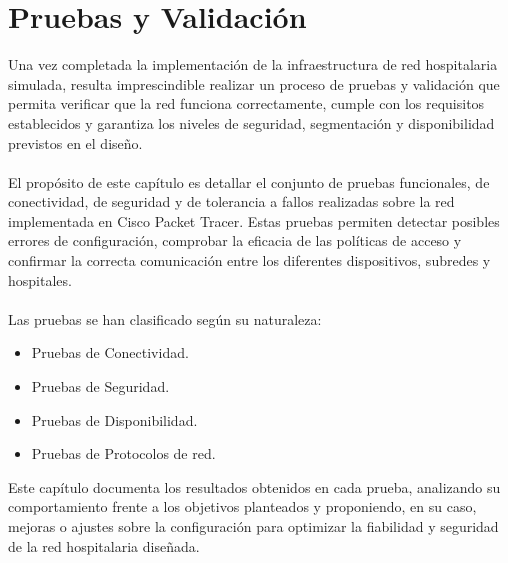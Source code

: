 
\chapter{Pruebas y Validación}\label{pruebas}
Una vez completada la implementación de la infraestructura de red hospitalaria simulada, resulta imprescindible realizar un proceso de pruebas y validación que permita 
verificar que la red funciona correctamente, cumple con los requisitos establecidos y garantiza los niveles de seguridad, segmentación y disponibilidad previstos en el diseño.
\\ \\
El propósito de este capítulo es detallar el conjunto de pruebas funcionales, de conectividad, de seguridad y de tolerancia a fallos realizadas sobre la red implementada en 
Cisco Packet Tracer. Estas pruebas permiten detectar posibles errores de configuración, comprobar la eficacia de las políticas de acceso y confirmar la correcta comunicación 
entre los diferentes dispositivos, subredes y hospitales.
\\ \\
Las pruebas se han clasificado según su naturaleza:
\begin{itemize}
    \item Pruebas de Conectividad.
    \item Pruebas de Seguridad.
    \item Pruebas de Disponibilidad.
    \item Pruebas de Protocolos de red.
\end{itemize}

Este capítulo documenta los resultados obtenidos en cada prueba, analizando su comportamiento frente a los objetivos planteados y proponiendo, en su caso, mejoras o ajustes sobre 
la configuración para optimizar la fiabilidad y seguridad de la red hospitalaria diseñada.

